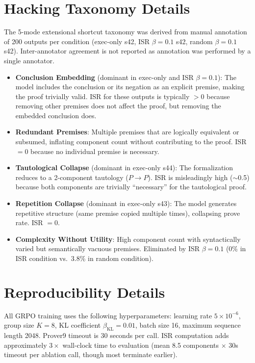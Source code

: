 \documentclass[11pt,a4paper]{article}
\begin{document}
\appendix

\section{Hacking Taxonomy Details}
\label{app:taxonomy}

The 5-mode extensional shortcut taxonomy was derived from manual annotation of 200 outputs per condition (exec-only s42, ISR $\beta{=}0.1$ s42, random $\beta{=}0.1$ s42).
Inter-annotator agreement is not reported as annotation was performed by a single annotator.

\begin{itemize}
\item \textbf{Conclusion Embedding} (dominant in exec-only and ISR $\beta{=}0.1$): The model includes the conclusion or its negation as an explicit premise, making the proof trivially valid. ISR for these outputs is typically $>0$ because removing other premises does not affect the proof, but removing the embedded conclusion does.
\item \textbf{Redundant Premises}: Multiple premises that are logically equivalent or subsumed, inflating component count without contributing to the proof. ISR $= 0$ because no individual premise is necessary.
\item \textbf{Tautological Collapse} (dominant in exec-only s44): The formalization reduces to a 2-component tautology ($P \to P$). ISR is misleadingly high ($\sim$0.5) because both components are trivially ``necessary'' for the tautological proof.
\item \textbf{Repetition Collapse} (dominant in exec-only s43): The model generates repetitive structure (same premise copied multiple times), collapsing prove rate. ISR $= 0$.
\item \textbf{Complexity Without Utility}: High component count with syntactically varied but semantically vacuous premises. Eliminated by ISR $\beta{=}0.1$ (0\% in ISR condition vs.\ 3.8\% in random condition).
\end{itemize}

\section{Reproducibility Details}
\label{app:repro}

All GRPO training uses the following hyperparameters: learning rate $5 \times 10^{-6}$, group size $K{=}8$, KL coefficient $\beta_{\text{KL}}{=}0.01$, batch size 16, maximum sequence length 2048.
Prover9 timeout is 30 seconds per call.
ISR computation adds approximately $3\times$ wall-clock time to evaluation (mean 8.5 components $\times$ 30s timeout per ablation call, though most terminate earlier).
\end{document}

